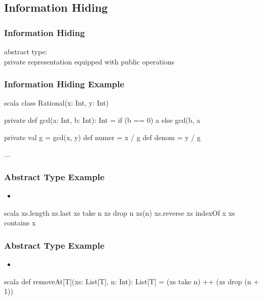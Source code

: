 \documentclass[dvipsnames]{beamer}
\theoremstyle{plain}
\begin{document}
\subsection{Information Hiding}

\begin{frame}
  \frametitle{Information Hiding}

  \begin{definition}
    \alert{abstract type}:\\
      private representation equipped with public operations
  \end{definition}
\end{frame}

\begin{frame}[fragile]
  \frametitle{Information Hiding Example}

  \begin{example}[Scala]
    \begin{pygments}{scala}
class Rational(x: Int, y: Int) {
    private def gcd(a: Int, b: Int): Int =
        if (b == 0) a else gcd(b, a %

    private val g = gcd(x, y)
    def numer = x / g
    def denom = y / g

    ...
}
    \end{pygments}
  \end{example}
\end{frame}

\begin{frame}[fragile]
  \frametitle{Abstract Type Example}

  \begin{example}
    \begin{itemize}
      \item {}
    \end{itemize}

    \begin{pygments}{scala}
xs.length
xs.last
xs take n
xs drop n
xs(n)
xs.reverse
xs indexOf x
xs contains x
    \end{pygments}
  \end{example}
\end{frame}

\begin{frame}[fragile]
  \frametitle{Abstract Type Example}

  \begin{example}
    \begin{itemize}
      \item {}
    \end{itemize}

    \pause
    \begin{pygments}{scala}
def removeAt[T](xs: List[T], n: Int): List[T] =
    (xs take n) ++ (xs drop (n + 1))
    \end{pygments}
  \end{example}
\end{frame}
\end{document}
